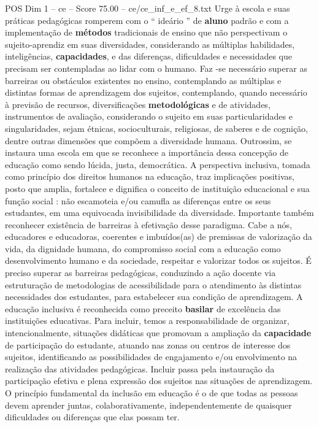 \begin{textsample}{POS Dim 1 – ce – Score 75.00 – ce/ce\_inf\_e\_ef\_8.txt}
Urge à escola e suas práticas pedagógicas romperem com o “ ideário ” de \textbf{aluno} padrão e com a implementação de \textbf{métodos} tradicionais de ensino que não perspectivam o sujeito-aprendiz em suas diversidades, considerando as múltiplas habilidades, inteligências, \textbf{capacidades}, e das diferenças, dificuldades e necessidades que precisam ser contempladas ao lidar com o humano.
Faz -se necessário superar as barreiras ou obstáculos existentes no ensino, contemplando as múltiplas e distintas formas de aprendizagem dos sujeitos, contemplando, quando necessário à previsão de recursos, diversificações \textbf{metodológicas} e de atividades, instrumentos de avaliação, considerando o sujeito em suas particularidades e singularidades, sejam étnicas, socioculturais, religiosas, de saberes e de cognição, dentre outras dimensões que compõem a diversidade humana.
Outrossim, se instaura uma escola em que se reconhece a importância dessa concepção de educação como sendo lúcida, justa, democrática.
A perspectiva inclusiva, tomada como princípio dos direitos humanos na educação, traz implicações positivas, posto que amplia, fortalece e dignifica o conceito de instituição educacional e sua função social : não escamoteia e/ou camufla as diferenças entre os seus estudantes, em uma equivocada invisibilidade da diversidade.
Importante também reconhecer existência de barreiras à efetivação desse paradigma.
Cabe a nós, educadores e educadoras, coerentes e imbuídos(as) de premissas de valorização da vida, da dignidade humana, do compromisso social com a educação como desenvolvimento humano e da sociedade, respeitar e valorizar todos os sujeitos.
É preciso superar as barreiras pedagógicas, conduzindo a ação docente via estruturação de metodologias de acessibilidade para o atendimento às distintas necessidades dos estudantes, para estabelecer sua condição de aprendizagem.
A educação inclusiva é reconhecida como preceito \textbf{basilar} de excelência das instituições educativas.
Para incluir, temos a responsabilidade de organizar, intencionalmente, situações didáticas que promovam a ampliação da \textbf{capacidade} de participação do estudante, atuando nas zonas ou centros de interesse dos sujeitos, identificando as possibilidades de engajamento e/ou envolvimento na realização das atividades pedagógicas.
Incluir passa pela instauração da participação efetiva e plena expressão dos sujeitos nas situações de aprendizagem.
O princípio fundamental da inclusão em educação é o de que todas as pessoas devem aprender juntas, colaborativamente, independentemente de quaisquer dificuldades ou diferenças que elas possam ter.

\end{textsample}
